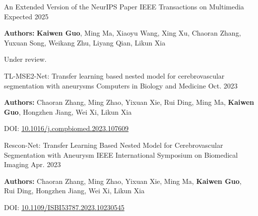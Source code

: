 

\begin{cventries}

  \cventry
  {} %
  {An Extended Version of the NeurIPS Paper} %
  {IEEE Transactions on Multimedia} %
  {Expected 2025} %
  {
    \begin{cvitems}
      \item{\textbf{Authors:} \textbf{Kaiwen Guo}, Ming Ma, Xiaoyu Wang, Xing Xu, Chaoran Zhang, Yuxuan Song, Weikang Zhu, Liyang Qian, Likun Xia}
      \item{Under review.}
    \end{cvitems}
  }

  \cventry
  {} %
  {TL-MSE2-Net: Transfer learning based nested model for cerebrovascular segmentation with aneurysms} %
  {Computers in Biology and Medicine} %
  {Oct. 2023} %
  {
    \begin{cvitems}
      \item{\textbf{Authors:} Chaoran Zhang, Ming Zhao, Yixuan Xie, Rui Ding, Ming Ma, \textbf{Kaiwen Guo}, Hongzhen Jiang, Wei Xi, Likun Xia}
      \item{DOI: \href{https://doi.org/10.1016/j.compbiomed.2023.107609}{10.1016/j.compbiomed.2023.107609}}
    \end{cvitems}
  }

  \cventry
  {} %
  {Rescon-Net: Transfer Learning Based Nested Model for Cerebrovascular Segmentation with Aneurysm} %
  {IEEE International Symposium on Biomedical Imaging} %
  {Apr. 2023} %
  {
    \begin{cvitems}
      \item{\textbf{Authors:} Chaoran Zhang, Ming Zhao, Yixuan Xie, Ming Ma, \textbf{Kaiwen Guo}, Rui Ding, Hongzhen Jiang, Wei Xi, Likun Xia}
      \item{DOI: \href{https://doi.org/10.1109/ISBI53787.2023.10230545}{10.1109/ISBI53787.2023.10230545}}
    \end{cvitems}
  }




\end{cventries}
